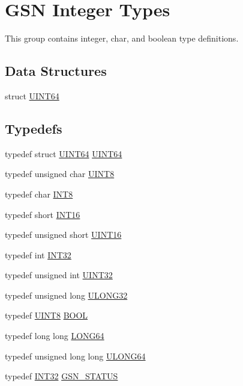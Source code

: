 \hypertarget{a00660}{
\section{GSN Integer Types}
\label{a00660}
}


This group contains integer, char, and boolean type definitions.  


\subsection*{Data Structures}
\begin{DoxyCompactItemize}
\item 
struct \hyperlink{a00462}{UINT64}
\end{DoxyCompactItemize}
\subsection*{Typedefs}
\begin{DoxyCompactItemize}
\item 
typedef struct \hyperlink{a00462}{UINT64} \hyperlink{a00660_ga2360b1c5f857c84c180aef97cc0612c9}{UINT64}
\item 
typedef unsigned char \hyperlink{a00660_gab27e9918b538ce9d8ca692479b375b6a}{UINT8}
\item 
typedef char \hyperlink{a00660_ga307b8734c020247f6bac4fcde0dcfbb9}{INT8}
\item 
typedef short \hyperlink{a00660_ga57de7cb8e702b1746127a4d5137fa455}{INT16}
\item 
typedef unsigned short \hyperlink{a00660_ga09f1a1fb2293e33483cc8d44aefb1eb1}{UINT16}
\item 
typedef int \hyperlink{a00660_ga63021d67d54286c2163bcdb43a6f2569}{INT32}
\item 
typedef unsigned int \hyperlink{a00660_gae1e6edbbc26d6fbc71a90190d0266018}{UINT32}
\item 
typedef unsigned long \hyperlink{a00660_gaa4ee7c96d5dff444cca1bf965c9f77fd}{ULONG32}
\item 
typedef \hyperlink{a00660_gab27e9918b538ce9d8ca692479b375b6a}{UINT8} \hyperlink{a00660_ga1f04022c0a182c51c059438790ea138c}{BOOL}
\item 
typedef long long \hyperlink{a00660_gae57305825c7d329ad8a3065ae045e875}{LONG64}
\item 
typedef unsigned long long \hyperlink{a00660_ga28961430434ccabca6862ea93fe9a15b}{ULONG64}
\item 
typedef \hyperlink{a00660_ga63021d67d54286c2163bcdb43a6f2569}{INT32} \hyperlink{a00660_gada5951904ac6110b1fa95e51a9ddc217}{GSN\_\-STATUS}
\end{DoxyCompactItemize}


